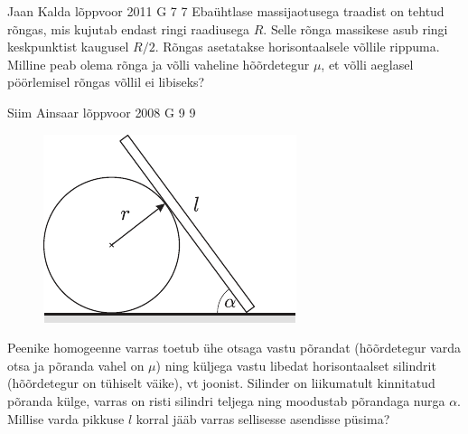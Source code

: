 \documentclass[11pt, twoside]{article}
\begin{document}
{%
{Jaan Kalda} %
{lõppvoor} %
{2011} %
{G 7} %
{7} %
{
\ifStatement
Ebaühtlase massijaotusega traadist on tehtud rõngas, mis kujutab endast ringi raadiusega $R$. Selle rõnga massikese asub ringi keskpunktist
kaugusel $R/2$. Rõngas asetatakse horisontaalsele võllile rippuma. Milline peab
olema rõnga ja võlli vaheline hõõrdetegur $\mu$, et võlli aeglasel pöörlemisel rõngas
võllil ei libiseks?
\fi
}

{Siim Ainsaar} %
{lõppvoor} %
{2008} %
{G 9} %
{9} %
{
\ifStatement
\begin{figure}
	\begin{center}
		\vspace{-25pt}
		\includegraphics[width=\linewidth]{2008-v3g-09-yl}
	\end{center}
\end{figure}
Peenike homogeenne varras toetub ühe otsaga vastu põrandat (hõõrdetegur varda otsa ja põranda vahel on $\mu$) ning küljega vastu libedat horisontaalset silindrit (hõõrdetegur on tühiselt väike), vt joonist. Silinder on liikumatult kinnitatud põranda külge, varras on risti silindri teljega ning moodustab põrandaga nurga $\alpha$. Millise varda pikkuse $l$ korral jääb varras sellisesse asendisse püsima?
\fi
}

}
\end{document}
